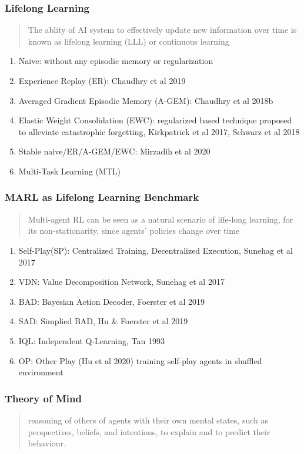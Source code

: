 \documentclass{njupre/njupre}
\begin{document}
\begin{frame}
    \frametitle{Lifelong Learning}
    \begin{quote}
        The ablity of AI system to effectively update new information over time is known as lifelong learning (LLL) or continuous learning
    \end{quote}
    \begin{enumerate}
        \item Naive: without any episodic memory or regularization
        \item Experience Replay (ER): Chaudhry et al 2019
        \item Averaged Gradient Episodic Memory (A-GEM): Chaudhry et al 2018b
        \item Elastic Weight Consolidation (EWC): regularized based technique proposed to alleviate catastrophic forgetting, Kirkpatrick et al 2017, Schwarz et al 2018
        \item Stable naive/ER/A-GEM/EWC: Mirzadih et al 2020
        \item Multi-Task Learning (MTL)
    \end{enumerate}
\end{frame}

\begin{frame}
    \frametitle{MARL as Lifelong Learning Benchmark}
    \begin{quote}
        Multi-agent RL can be seen as a natural scenario of life-long learning, for its non-stationarity, since agents' policies change over time
    \end{quote}
    \begin{enumerate}
        \item Self-Play(SP): Centralized Training, Decentralized Execution, Sunehag et al 2017
        \item VDN: Value Decomposition Network, Sunehag et al 2017
        \item BAD: Bayesian Action Decoder, Foerster et al 2019
        \item SAD: Simplied BAD, Hu \& Foerster et al 2019
        \item IQL: Independent Q-Learning, Tan 1993
        \item OP: Other Play (Hu et al 2020) training self-play agents in shuffled environment
    \end{enumerate}
\end{frame}

\begin{frame}
    \frametitle{Theory of Mind}

    \begin{quote}
        reasoning of others of agents with their own mental states,
        such as perspectives, beliefs, and intentions,
        to explain and to predict their behaviour.
    \end{quote}
\end{frame}
\end{document}
